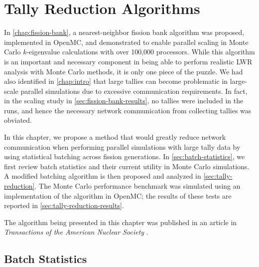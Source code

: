 \chapter{Tally Reduction Algorithms}
\label{chap:tally-reduction}

In \autoref{chap:fission-bank}, a nearest-neighbor fission bank algorithm was
proposed, implemented in OpenMC, and demonstrated to enable parallel scaling in
Monte Carlo $k$-eigenvalue calculations with over 100,000 processors. While this
algorithm is an important and necessary component in being able to perform
realistic LWR analysis with Monte Carlo methods, it is only one piece of the
puzzle. We had also identified in \autoref{chap:intro} that large tallies can
become problematic in large-scale parallel simulations due to excessive
communication requirements. In fact, in the scaling study in
\autoref{sec:fission-bank-results}, no tallies were included in the runs, and
hence the necessary network communication from collecting tallies was obviated.

In this chapter, we propose a method that would greatly reduce network
communication when performing parallel simulations with large tally data by
using statistical batching across fission generations. In
\autoref{sec:batch-statistics}, we first review batch statistics and their
current utility in Monte Carlo simulations. A modified batching algorithm is
then proposed and analyzed in \autoref{sec:tally-reduction}. The Monte Carlo
performance benchmark was simulated using an implementation of the algorithm in
OpenMC; the results of these tests are reported in
\autoref{sec:tally-reduction-results}.

The algorithm being presented in this chapter was published in an article in
\emph{Transactions of the American Nuclear Society} \cite{trans-romano-2012}.

\section{Batch Statistics}
\label{sec:batch-statistics}

